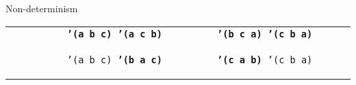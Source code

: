 \begin{frame}{Non-determinism}
  \tiny
  \begin{tabularx}{\textwidth}{ X X }
    \texttt{\ \newline
      \ \newline
      \ \newline
      \ \newline
      \ \newline
      \hphantom{\_\_\_\_\_\_}\textbf{'(a b c)\newline
      \hphantom{\_\_\_\_\_\_}'(a c b)}\newline
      \ 
    }
    &
    \texttt{\ \newline
      \ \newline
      \ \newline
      \hphantom{\_\_\_\_\_\_}\textbf{'(b c a)\newline
      \hphantom{\_\_\_\_\_\_}'(c b a)}\newline
      \ \newline
      \ \newline
      \ 
    }

    \\

    \texttt{\ \newline
      \ \newline
      \ \newline
      \ \newline
      \ \newline
      \hphantom{\_\_\_\_\_\_}'(a b c)\newline
      \hphantom{\_\_\_\_\_\_}\textbf{'(b a c)}\newline
      \ 
    }
    &
    \texttt{\ \newline
      \ \newline
      \ \newline
      \hphantom{\_\_\_\_\_\_}\textbf{'(c a b)}\newline
      \hphantom{\_\_\_\_\_\_}'(c b a)\newline
      \ \newline
      \ \newline
      \ 
    }

  \end{tabularx}
\end{frame}
